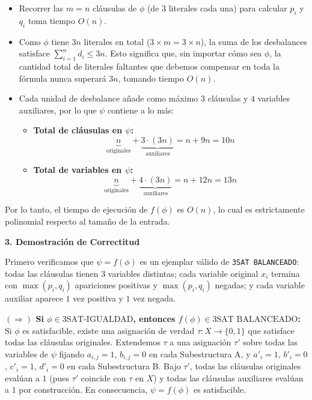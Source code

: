 \begin{itemize}[leftmargin=*]
    \item Recorrer las $m = n$ cláusulas de $\phi$ (de $3$ literales cada una) para calcular $p_i$ y $q_i$ toma tiempo $O(n)$.
    \item Como $\phi$ tiene $3n$ literales en total ($3 \times m = 3 \times n$), la suma de los desbalances satisface $\sum_{i=1}^n d_i \le 3n$. Esto significa que, sin importar cómo sea $\phi$, la cantidad total de literales faltantes que debemos compensar en toda la fórmula nunca superará $3n$, tomando tiempo $O(n)$.
    \item Cada unidad de desbalance añade como máximo $3$ cláusulas y $4$ variables auxiliares, por lo que $\psi$ contiene a lo más:
    \begin{itemize}[leftmargin=*]
        \item \textbf{Total de cláusulas en $\psi$:}
        \[ \underbrace{n}_{\text{originales}} + \underbrace{3 \cdot (3n)}_{\text{auxiliares}} = n + 9n = 10n \]

        \item \textbf{Total de variables en $\psi$:}
        \[ \underbrace{n}_{\text{originales}} + \underbrace{4 \cdot (3n)}_{\text{auxiliares}} = n + 12n = 13n \]
    \end{itemize}
\end{itemize}

Por lo tanto, el tiempo de ejecución de $f(\phi)$ es \textbf{$O(n)$}, lo cual es estrictamente polinomial respecto al tamaño de la entrada.

\vspace{0.3cm}
\noindent\textbf{3. Demostración de Correctitud}

Primero verificamos que $\psi = f(\phi)$ es un ejemplar válido de \texttt{3SAT BALANCEADO}: todas las cláusulas tienen $3$ variables distintas; cada variable original $x_i$ termina con $\max(p_i, q_i)$ apariciones positivas y $\max(p_i, q_i)$ negadas; y cada variable auxiliar aparece $1$ vez positiva y $1$ vez negada.

\vspace{0.2cm}
\noindent\textbf{$(\Rightarrow)$ Si $\phi \in \text{3SAT-IGUALDAD}$, entonces $f(\phi) \in \text{3SAT BALANCEADO}$:}\\
Si $\phi$ es satisfacible, existe una asignación de verdad $\tau: X \to \{0, 1\}$ que satisface todas las cláusulas originales. Extendemos $\tau$ a una asignación $\tau'$ sobre todas las variables de $\psi$ fijando $a_{i,j} = 1$, $b_{i,j} = 0$ en cada Subestructura A, y $a'_i = 1$, $b'_i = 0$, $c'_i = 1$, $d'_i = 0$ en cada Subestructura B. Bajo $\tau'$, todas las cláusulas originales evalúan a $1$ (pues $\tau'$ coincide con $\tau$ en $X$) y todas las cláusulas auxiliares evalúan a $1$ por construcción. En consecuencia, $\psi = f(\phi)$ es satisfacible.

